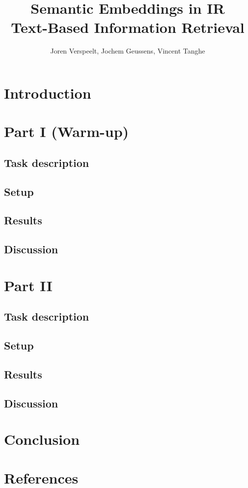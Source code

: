 \documentclass[11pt,a4paper]{extarticle}
\author{Joren Verspeelt, Jochem Geussens, Vincent Tanghe}
\title{Semantic Embeddings in IR \\
	\large Text-Based Information Retrieval}
\begin{document}
\maketitle

\section {Introduction}


\clearpage
\tableofcontents
\clearpage



\section {Part I (Warm-up)}
\subsection{Task description}


\subsection{Setup}


\subsection{Results}


\subsection{Discussion}




\section{Part II}
\subsection{Task description}


\subsection{Setup}


\subsection{Results}


\subsection{Discussion}



\section{Conclusion}


\section{References}


	
\end{document}
